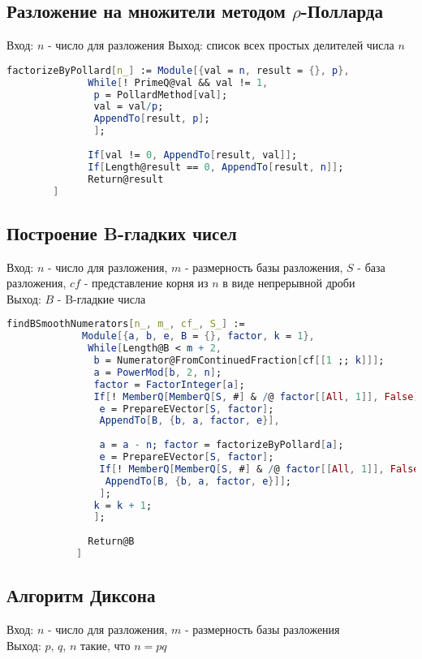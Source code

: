     	\subsection{Разложение на множители методом $\rho$-Полларда}
    		Вход: $n$ - число для разложения
    		Выход: список всех простых делителей числа $n$

    		\begin{lstlisting}[language=Mathematica,caption={
	      		Разложение на множители
	    	}]
		factorizeByPollard[n_] := Module[{val = n, result = {}, p},
			  While[! PrimeQ@val && val != 1,
			   p = PollardMethod[val];
			   val = val/p;
			   AppendTo[result, p];
			   ];
			  
			  If[val != 0, AppendTo[result, val]];
			  If[Length@result == 0, AppendTo[result, n]];
			  Return@result
		]
	    	\end{lstlisting}

		\subsection{Построение B-гладких чисел}
			Вход: $n$ - число для разложения, $m$ - размерность базы разложения, $S$ - база разложения, $cf$ - представление корня из $n$ в виде
			непрерывной дроби\\
			Выход: $B$ - B-гладкие числа

			\begin{lstlisting}[language=Mathematica,caption={
	      		Построение B-гладких чисел
	    	}]
			findBSmoothNumerators[n_, m_, cf_, S_] := 
			 Module[{a, b, e, B = {}, factor, k = 1},
			  While[Length@B < m + 2,
			   b = Numerator@FromContinuedFraction[cf[[1 ;; k]]];
			   a = PowerMod[b, 2, n];
			   factor = FactorInteger[a];
			   If[! MemberQ[MemberQ[S, #] & /@ factor[[All, 1]], False],
			    e = PrepareEVector[S, factor];
			    AppendTo[B, {b, a, factor, e}],
			    
			    a = a - n; factor = factorizeByPollard[a];
			    e = PrepareEVector[S, factor];
			    If[! MemberQ[MemberQ[S, #] & /@ factor[[All, 1]], False], 
			     AppendTo[B, {b, a, factor, e}]];
			    ];
			   k = k + 1;
			   ];
			  
			  Return@B
			]
	    	\end{lstlisting}

		\subsection{Алгоритм Диксона}
			Вход: $n$ - число для разложения, $m$ - размерность базы разложения \\
			Выход: $p$, $q$, $n$ такие, что $n = p q$

